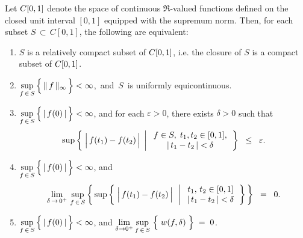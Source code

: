 \begin{theorem}
\label{BillingsleyArzelaAscoli}
\mbox{}\vskip 0.1cm
\noindent
Let $C[0,1]$ denote the space of continuous $\Re$-valued functions
defined on the closed unit interval $[0,1]$ equipped with the supremum norm.
Then, for each subset $S \,\subset\, C[0,1]$, the following are equivalent:
\begin{enumerate}
\item	$S$ is a relatively compact subset of $C[0,1]$, i.e. the closure of $S$ is a compact subset of $C[0,1]$.
\item	$\underset{f\,\in\,S}{\sup}\left\{\,\Vert\,\overset{{\color{white}.}}{f}\,\Vert_{\infty}\,\right\} < \infty$,\,
		and \,$S$\, is uniformly equicontinuous.
\item	$\underset{f\,\in\,S}{\sup}\left\{\,\vert\,\overset{{\color{white}.}}{f}(0)\,\vert\,\right\} < \infty$, and
		for each $\varepsilon > 0$, there exists $\delta > 0$ such that
		\begin{equation*}
		\sup\left\{\;
		\left\vert\,\overset{{\color{white}.}}{f}(t_{1}) - f(t_{2})\,\right\vert
		\;\left\vert\;
		\begin{array}{c} f \in S, \; t_{1},t_{2} \in [0,1], \\ \vert\,t_{1} - t_{2}\,\vert < \delta \end{array}
		\right.
		\right\}
		\;\;\leq\;\; \varepsilon.
		\end{equation*}
\item	$\underset{f\,\in\,S}{\sup}\left\{\,\vert\,\overset{{\color{white}.}}{f}(0)\,\vert\,\right\} < \infty$, and
		\begin{equation*}
		\lim_{\delta\,\rightarrow\,0^{+}}\,
			\sup_{f\,\in\,S}\left\{\,
				\sup\left\{\;
				\left\vert\,\overset{{\color{white}.}}{f}(t_{1}) - f(t_{2})\,\right\vert
				\,\;\left\vert\;
				\begin{array}{c} t_{1}, \, t_{2} \in [0,1] \\ \vert\,t_{1} - t_{2}\,\vert < \delta \end{array}
				\right.
				\right\}
			\,\right\}
		\;\;=\;\; 0.
		\end{equation*}
\item	$\underset{f\,\in\,S}{\sup}\left\{\,\vert\,\overset{{\color{white}.}}{f}(0)\,\vert\,\right\} < \infty$,
		\;and\;\;
		$\underset{\delta\rightarrow 0^{+}}{\lim}\,\underset{f\,\in\,S}{\sup}\,\left\{\;\overset{{\color{white}:}}{w}(f,\delta)\;\right\}\;=\;0$.
\end{enumerate}
\end{theorem}
